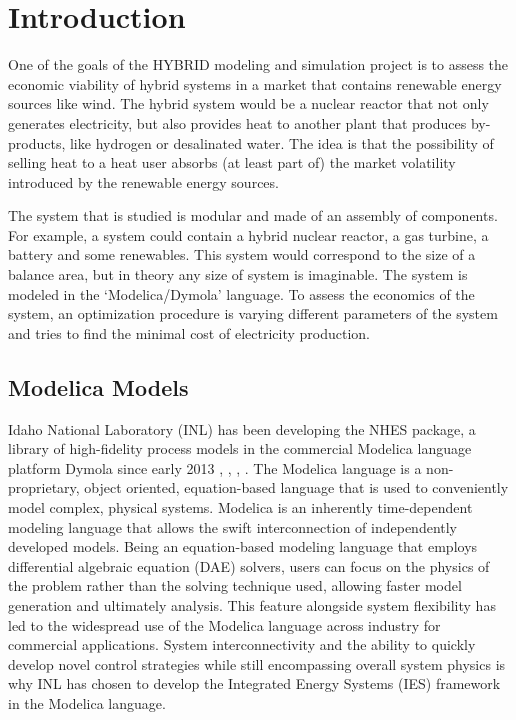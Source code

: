 \section{Introduction}
One of the goals of the HYBRID modeling and simulation project is to assess the economic viability of hybrid systems in a market that contains renewable energy sources like wind. The hybrid system would be a nuclear reactor that not only generates electricity, but also provides heat to another plant that produces by-products, like hydrogen or desalinated water. The idea is that the possibility of selling heat to a heat user absorbs (at least part of) the market volatility introduced by the renewable energy sources.

The system that is studied is modular and made of an assembly of components. For example, a system could contain a hybrid nuclear reactor, a gas turbine, a battery and some renewables. This system would correspond to the size of a balance area, but in theory any size of system is imaginable. The system is modeled in the ‘Modelica/Dymola’ language.
To assess the economics of the system, an optimization procedure is varying different parameters of the system and tries to find the minimal cost of electricity production.

\subsection{Modelica Models}
Idaho National Laboratory (INL) has been developing the NHES package, a library of high-fidelity process models in the commercial Modelica language platform Dymola since early 2013 \cite{2017Report}, \cite{2016HTSE}, \cite{2018ThermalStorage}, \cite{2019NuScaleM4}. The Modelica language is a non-proprietary, object oriented, equation-based language that is used to conveniently model complex, physical systems. Modelica is an inherently time-dependent modeling language that allows the swift interconnection of independently developed models. Being an equation-based modeling language that employs differential algebraic equation (DAE) solvers, users can focus on the physics of the problem rather than the solving technique used, allowing faster model generation and ultimately analysis. This feature alongside system flexibility has led to the widespread use of the Modelica language across industry for commercial applications. System interconnectivity and the ability to quickly develop novel control strategies while still encompassing overall system physics is why INL has chosen to develop the Integrated Energy Systems (IES) framework in the Modelica language.

